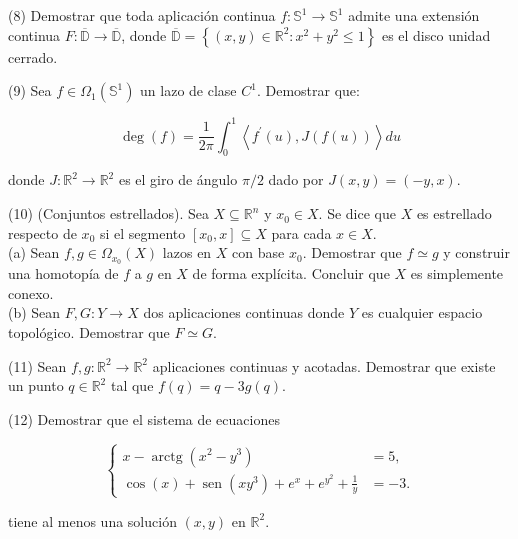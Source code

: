 \documentclass[
  a4paper,
  spanish,
  12pt,
]{scrartcl}
\begin{document}
\begin{ejer}
(8) Demostrar que toda aplicación continua $f: \mathbb{S}^{1} \rightarrow \mathbb{S}^{1}$ admite una extensión continua $F: \overline{\mathbb{D}} \rightarrow \overline{\mathbb{D}}$, donde $\overline{\mathbb{D}}=\left\{(x, y) \in \mathbb{R}^{2}: x^{2}+y^{2} \leq 1\right\}$ es el disco unidad cerrado.\\
\end{ejer}

\begin{ejer}
(9) Sea $f \in \Omega_{1}\left(\mathbb{S}^{1}\right)$ un lazo de clase $C^{1}$. Demostrar que:

$$
\operatorname{deg}(f)=\frac{1}{2 \pi} \int_{0}^{1}\left\langle f^{\prime}(u), J(f(u))\right\rangle d u
$$

donde $J: \mathbb{R}^{2} \rightarrow \mathbb{R}^{2}$ es el giro de ángulo $\pi / 2$ dado por $J(x, y)=(-y, x)$.\\
\end{ejer}

\begin{ejer}
(10) (Conjuntos estrellados). Sea $X \subseteq \mathbb{R}^{n}$ y $x_{0} \in X$. Se dice que $X$ es estrellado respecto de $x_{0}$ si el segmento $\left[x_{0}, x\right] \subseteq X$ para cada $x \in X$.\\
(a) Sean $f, g \in \Omega_{x_{0}}(X)$ lazos en $X$ con base $x_{0}$. Demostrar que $f \simeq g$ y construir una homotopía de $f$ a $g$ en $X$ de forma explícita. Concluir que $X$ es simplemente conexo.\\
(b) Sean $F, G: Y \rightarrow X$ dos aplicaciones continuas donde $Y$ es cualquier espacio topológico. Demostrar que $F \simeq G$.\\
\end{ejer}

\begin{ejer}
(11) Sean $f, g: \mathbb{R}^{2} \rightarrow \mathbb{R}^{2}$ aplicaciones continuas y acotadas. Demostrar que existe un punto $q \in \mathbb{R}^{2}$ tal que $f(q)=q-3 g(q)$.\\
\end{ejer}

\begin{ejer}
(12) Demostrar que el sistema de ecuaciones

$$
\left\{\begin{aligned}
x-\operatorname{arctg}\left(x^{2}-y^{3}\right) & =5, \\
\cos (x)+\operatorname{sen}\left(x y^{3}\right)+e^{x}+e^{y^{2}}+\frac{1}{y} & =-3 .
\end{aligned}\right.
$$

tiene al menos una solución $(x, y)$ en $\mathbb{R}^{2}$.\\
\end{ejer}
\end{document}
